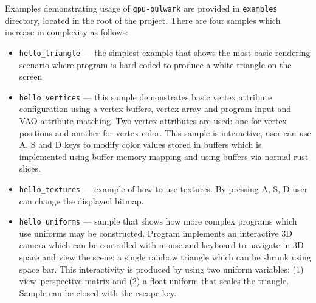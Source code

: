 Examples demonstrating usage of \texttt{gpu-bulwark} are provided in \texttt{examples} directory, located in the root of the project.
There are four samples which increase in complexity as follows:
\begin{itemize}
    \item \texttt{hello\_triangle} --- the simplest example that shows the most basic rendering scenario where program is hard coded to produce a white
        triangle on the screen
    \item \texttt{hello\_vertices} --- this sample demonstrates basic vertex attribute configuration using a vertex buffers, 
        vertex array and program input and VAO attribute matching. 
        Two vertex attributes are used: one for vertex positions and another for vertex color.
        This sample is interactive, user can use A, S and D keys to modify color values stored in buffers 
        which is implemented using buffer memory mapping and using buffers via normal rust slices.
    \item \texttt{hello\_textures} --- example of how to use textures. By pressing A, S, D user can change the displayed bitmap.
    \item \texttt{hello\_uniforms} --- sample that shows how more complex programs which use uniforms may be constructed.
        Program implements an interactive 3D camera which can be controlled with mouse and keyboard to navigate in 3D space and
        view the scene: a single rainbow triangle which can be shrunk using space bar. This interactivity is produced by using two uniform variables: 
        (1) view--perspective matrix and (2) a float uniform that scales the triangle. Sample can be closed with the escape key.
\end{itemize}
